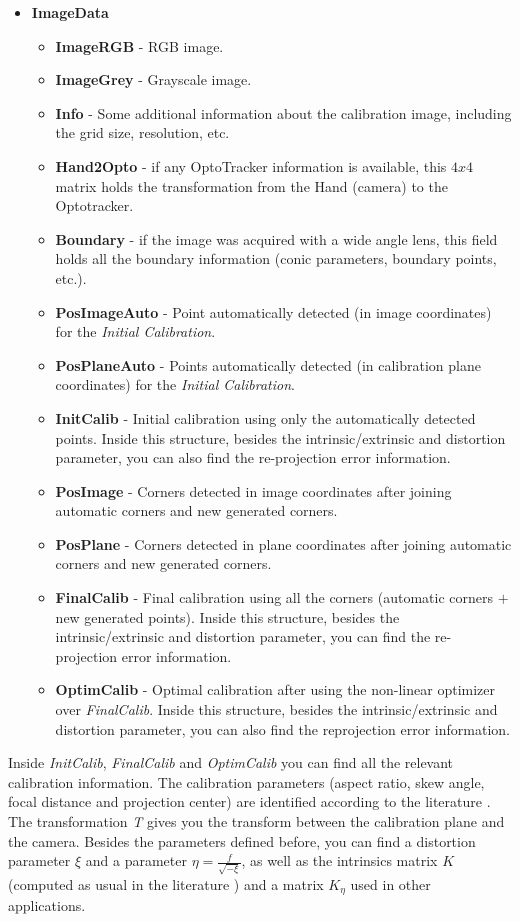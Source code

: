 \documentclass[article,11pt]{memoir}
\begin{document}
\begin{itemize}
 \footnotesize
\item \textbf{ImageData}
\begin{itemize}
 \item \textbf{ImageRGB} - RGB image.
  \item \textbf{ImageGrey} - Grayscale image.
  \item \textbf{Info} - Some additional information about the calibration image, including the grid size, resolution, etc.
  \item \textbf{Hand2Opto} - if any OptoTracker information is available, this $4x4$ matrix holds the transformation from the Hand (camera) to the Optotracker.
  \item \textbf{Boundary} - if the image was acquired with a wide angle lens, this field holds all the boundary information (conic parameters, boundary points, etc.).
  \item \textbf{PosImageAuto} - Point automatically detected (in image coordinates) for the \textit{Initial Calibration}.
  \item \textbf{PosPlaneAuto} - Points automatically detected (in calibration plane coordinates) for the \textit{Initial Calibration}.
  \item \textbf{InitCalib} - Initial calibration using only the automatically detected points. Inside this structure, besides the intrinsic/extrinsic and distortion parameter, you can also find the re-projection error information.
  \item \textbf{PosImage} - Corners detected in image coordinates after joining automatic corners and new generated corners.
  \item \textbf{PosPlane} - Corners detected in plane coordinates after joining automatic corners and new generated corners.
  \item \textbf{FinalCalib} - Final calibration using all the corners (automatic corners $+$ new generated points). Inside this structure, besides the intrinsic/extrinsic and distortion parameter, you can find the re-projection error information.
  \item \textbf{OptimCalib} - Optimal calibration after using the non-linear optimizer over \textit{FinalCalib}. Inside this structure, besides the intrinsic/extrinsic and distortion parameter, you can also find the reprojection error information.
\end{itemize}
\end{itemize}

Inside \textit{InitCalib}, \textit{FinalCalib} and \textit{OptimCalib} you can find all the relevant calibration information. The calibration parameters (aspect ratio, skew angle, focal distance and projection center) are identified according to the literature \cite{amarelo}. The transformation \textit{T} gives you the transform between the calibration plane and the camera. Besides the parameters defined before, you can find a distortion parameter $\xi$ and a parameter $\eta=\frac{f}{\sqrt{-\xi}}$, as well as the intrinsics matrix $K$ (computed as usual in the literature \cite{amarelo}) and a matrix $K_{\eta}$ used in other applications.
\end{document}

